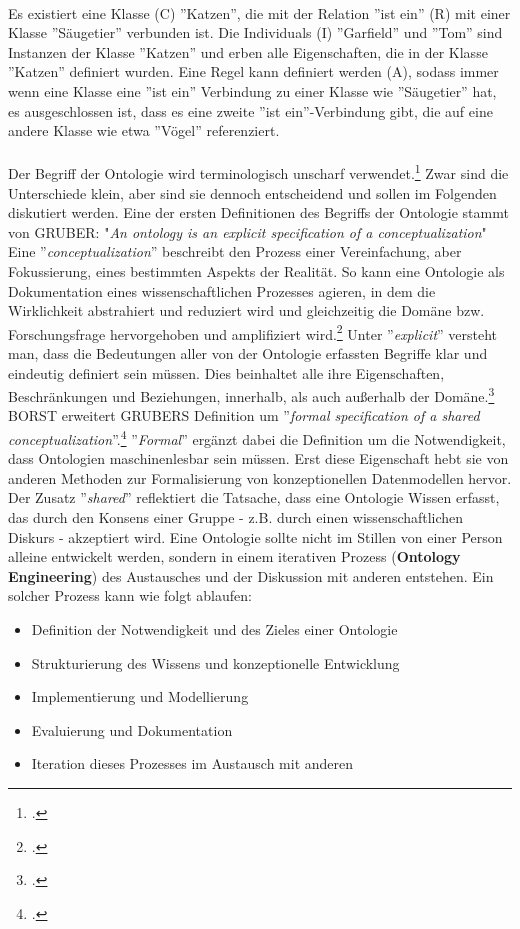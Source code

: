 \documentclass[12pt,a4paper]{article}
\begin{document}
\\
Es existiert eine Klasse (C) ''Katzen'', die mit der Relation ''ist ein'' (R) mit einer Klasse ''Säugetier'' verbunden ist.  Die Individuals (I) ''Garfield'' und ''Tom'' sind Instanzen der Klasse ''Katzen'' und erben alle Eigenschaften, die in der Klasse ''Katzen'' definiert wurden. Eine Regel kann definiert werden (A), sodass immer wenn eine Klasse eine ''ist ein'' Verbindung zu einer Klasse wie ''Säugetier'' hat, es ausgeschlossen ist, dass es eine zweite ''ist ein''-Verbindung  gibt, die auf eine andere Klasse wie etwa ''Vögel'' referenziert. 
\\
\\
Der Begriff der Ontologie wird terminologisch unscharf verwendet.\footcite[][S.1]{gruber1993translation} Zwar sind die Unterschiede klein, aber sind sie dennoch entscheidend und sollen im Folgenden diskutiert werden.
Eine der ersten Definitionen des Begriffs der Ontologie stammt von GRUBER: "\textit{An ontology is an explicit specification of a conceptualization}"
\\
Eine ''\textit{conceptualization}'' beschreibt den Prozess einer Vereinfachung, aber Fokussierung, eines bestimmten Aspekts der Realität. So kann eine Ontologie als Dokumentation eines wissenschaftlichen 
Prozesses agieren, in dem die Wirklichkeit abstrahiert und reduziert wird und gleichzeitig die Domäne bzw. Forschungsfrage hervorgehoben und amplifiziert wird.\footcite[][]{thaller2017ungefahre}
Unter ''\textit{explicit}'' versteht man, dass die Bedeutungen aller von der Ontologie erfassten Begriffe klar und eindeutig definiert sein müssen. Dies beinhaltet alle ihre Eigenschaften, Beschränkungen und Beziehungen, innerhalb, als auch außerhalb der Domäne.\footcite{sure2003methodology}
BORST erweitert GRUBERS Definition um  ''\textit{formal specification of a shared  conceptualization}''.\footcite{borst1997construction}
''\textit{Formal}'' ergänzt dabei die Definition um die Notwendigkeit, dass Ontologien maschinenlesbar sein müssen. Erst diese Eigenschaft hebt sie von anderen Methoden zur Formalisierung von konzeptionellen Datenmodellen hervor. Der Zusatz ''\textit{shared}'' reflektiert die Tatsache, dass eine Ontologie Wissen erfasst, das durch den Konsens einer Gruppe - z.B. durch einen wissenschaftlichen Diskurs - akzeptiert wird. Eine Ontologie sollte nicht im Stillen von einer Person alleine entwickelt werden, sondern in einem iterativen Prozess (\textbf{Ontology Engineering}) des Austausches und der Diskussion mit anderen entstehen. Ein solcher Prozess kann wie folgt ablaufen:
\begin{itemize}
\item Definition der Notwendigkeit und des Zieles einer Ontologie
\item Strukturierung des Wissens und konzeptionelle Entwicklung
\item Implementierung und Modellierung
\item Evaluierung und Dokumentation
\item Iteration dieses Prozesses im Austausch mit anderen
\end{itemize}
\end{document}
